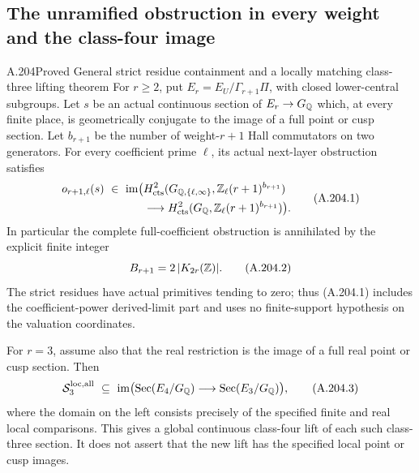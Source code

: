 \subsection{The unramified obstruction in every weight and the class-four image}

\begin{statement}{A.204}{Proved}
{General strict residue containment and a locally matching class-three lifting theorem}
For \(r\geq2\), put \(E_r=E_U/\Gamma_{r+1}\Pi\), with
closed lower-central subgroups.  Let \(s\) be an actual continuous
section of \(E_r\to G_\mathbb Q\) which, at every finite place, is
geometrically conjugate to the image of a full point or cusp
section.  Let \(b_{r+1}\) be the number of weight-\(r+1\)
Hall commutators on two generators.  For every coefficient
prime \(\ell\), its actual next-layer obstruction satisfies
\[
\begin{split}
 o_{r+1,\ell}(s)\ \in\
 \operatorname{im}\bigl(&H^2_{\rm cts}
       (G_{\mathbb Q,\{\ell,\infty\}},\mathbb Z_\ell(r+1)^{b_{r+1}})\\
       &\longrightarrow H^2_{\rm cts}
       (G_\mathbb Q,\mathbb Z_\ell(r+1)^{b_{r+1}})\bigr).
\end{split}
\tag{A.204.1}
\]
In particular the complete full-coefficient obstruction is
annihilated by the explicit finite integer
\[
                 B_{r+1}=2\,|K_{2r}(\mathbb Z)|.
\tag{A.204.2}
\]
The strict residues have actual primitives tending to zero;
thus (A.204.1) includes the coefficient-power derived-limit
part and uses no finite-support hypothesis on the valuation
coordinates.

For \(r=3\), assume also that the real restriction is the
image of a full real point or cusp section.  Then
\[
 \mathcal{S}^{\rm loc,all}_3\ \subseteq\
 \operatorname{im}\bigl(\operatorname{Sec}(E_4/G_\mathbb Q)
          \longrightarrow\operatorname{Sec}(E_3/G_\mathbb Q)\bigr),
\tag{A.204.3}
\]
where the domain on the left consists precisely of the
specified finite and real local comparisons.
This gives a global continuous class-four lift of each such
class-three section.  It does not assert that the new lift
has the specified local point or cusp images.
\end{statement}

